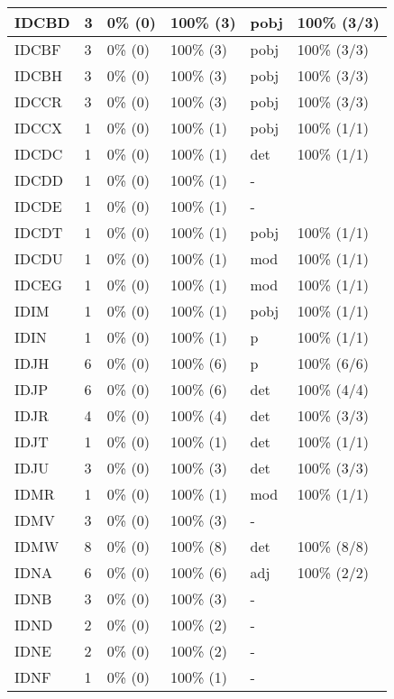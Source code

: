 \begin{figure*}
\begin{tabular}{|l|l|l|l||l|l|}
\hline
 IDCBD & 3 & 0\% (0) & 100\% (3) & pobj & 100\% (3/3) \\ 
\hline
 IDCBF & 3 & 0\% (0) & 100\% (3) & pobj & 100\% (3/3) \\ 
\hline
 IDCBH & 3 & 0\% (0) & 100\% (3) & pobj & 100\% (3/3) \\ 
\hline
 IDCCR & 3 & 0\% (0) & 100\% (3) & pobj & 100\% (3/3) \\ 
\hline
 IDCCX & 1 & 0\% (0) & 100\% (1) & pobj & 100\% (1/1) \\ 
\hline
 IDCDC & 1 & 0\% (0) & 100\% (1) & det & 100\% (1/1) \\ 
\hline
 IDCDD & 1 & 0\% (0) & 100\% (1) & - &  \\ 
\hline
 IDCDE & 1 & 0\% (0) & 100\% (1) & - &  \\ 
\hline
 IDCDT & 1 & 0\% (0) & 100\% (1) & pobj & 100\% (1/1) \\ 
\hline
 IDCDU & 1 & 0\% (0) & 100\% (1) & mod & 100\% (1/1) \\ 
\hline
 IDCEG & 1 & 0\% (0) & 100\% (1) & mod & 100\% (1/1) \\ 
\hline
 IDIM & 1 & 0\% (0) & 100\% (1) & pobj & 100\% (1/1) \\ 
\hline
 IDIN & 1 & 0\% (0) & 100\% (1) & p & 100\% (1/1) \\ 
\hline
 IDJH & 6 & 0\% (0) & 100\% (6) & p & 100\% (6/6) \\ 
\hline
 IDJP & 6 & 0\% (0) & 100\% (6) & det & 100\% (4/4) \\ 
\hline
 IDJR & 4 & 0\% (0) & 100\% (4) & det & 100\% (3/3) \\ 
\hline
 IDJT & 1 & 0\% (0) & 100\% (1) & det & 100\% (1/1) \\ 
\hline
 IDJU & 3 & 0\% (0) & 100\% (3) & det & 100\% (3/3) \\ 
\hline
 IDMR & 1 & 0\% (0) & 100\% (1) & mod & 100\% (1/1) \\ 
\hline
 IDMV & 3 & 0\% (0) & 100\% (3) & - &  \\ 
\hline
 IDMW & 8 & 0\% (0) & 100\% (8) & det & 100\% (8/8) \\ 
\hline
 IDNA & 6 & 0\% (0) & 100\% (6) & adj & 100\% (2/2) \\ 
\hline
 IDNB & 3 & 0\% (0) & 100\% (3) & - &  \\ 
\hline
 IDND & 2 & 0\% (0) & 100\% (2) & - &  \\ 
\hline
 IDNE & 2 & 0\% (0) & 100\% (2) & - &  \\ 
\hline
 IDNF & 1 & 0\% (0) & 100\% (1) & - &  \\ 
\hline
\end{tabular}
\end{figure*}
